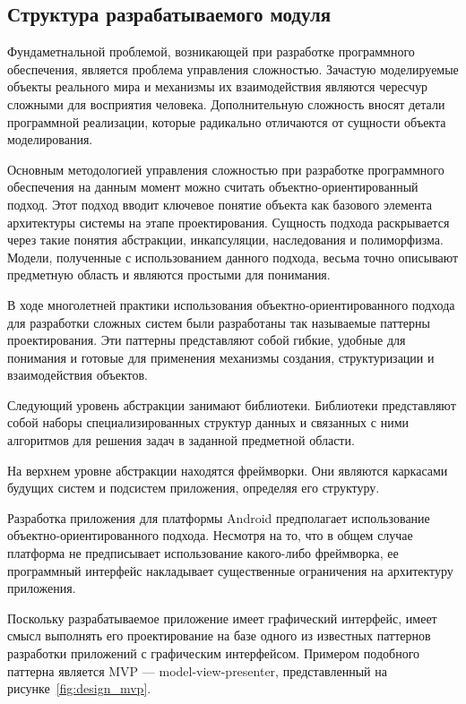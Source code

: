 \subsection{Структура разрабатываемого модуля}

Фундаметнальной проблемой, возникающей при разработке программного обеспечения,
является проблема управления сложностью. Зачастую моделируемые объекты реального
мира и механизмы их взаимодействия являются чересчур сложными для восприятия человека.
Дополнительную сложность вносят детали программной
реализации, которые радикально отличаются от сущности объекта моделирования.

Основным методологией управления сложностью при разработке программного обеспечения
на данным момент можно считать объектно-ориентированный подход.
Этот подход вводит ключевое понятие объекта как базового элемента
архитектуры системы на этапе проектирования.
Сущность подхода раскрывается через такие понятия абстракции, инкапсуляции,
наследования и полиморфизма.
Модели, полученные с использованием данного подхода, весьма точно
описывают предметную область и являются простыми для понимания.

В ходе многолетней практики использования объектно-ориентированного подхода
для разработки сложных систем были разработаны так называемые паттерны проектирования.
Эти паттерны представляют собой гибкие, удобные для понимания и
готовые для применения механизмы создания, структуризации и взаимодействия объектов.

Следующий уровень абстракции занимают библиотеки.
Библиотеки представляют собой наборы специализированных структур данных и
связанных с ними алгоритмов для решения задач в заданной предметной области.

На верхнем уровне абстракции находятся фреймворки.
Они являются каркасами будущих систем и подсистем приложения, определяя его структуру.

Разработка приложения для платформы Android предполагает использование
объектно-ориентированного подхода. Несмотря на то, что в общем случае
платформа не предписывает использование какого-либо фреймворка,
ее программный интерфейс накладывает существенные ограничения на
архитектуру приложения.

Поскольку разрабатываемое приложение имеет графический интерфейс,
имеет смысл выполнять его проектирование на базе одного из известных паттернов
разработки приложений с графическим интерфейсом. Примером подобного паттерна
является MVP --- model-view-presenter, представленный на
рисунке~\ref{fig:design_mvp}.

